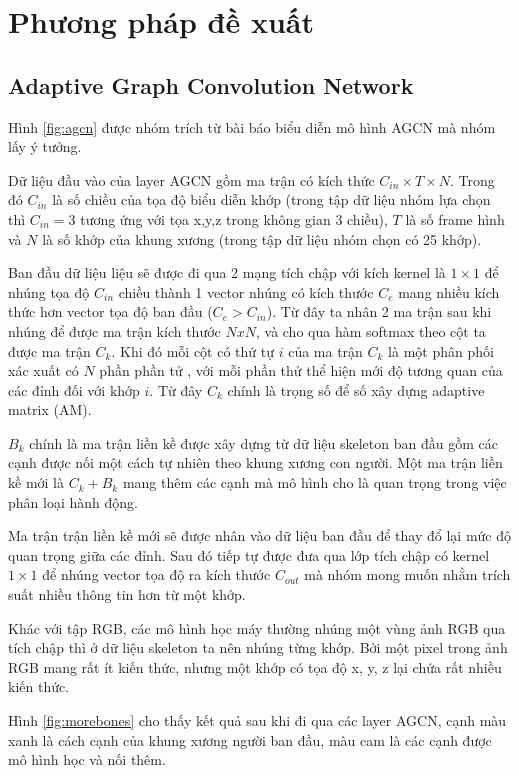 \section{Phương pháp đề xuất}

\subsection{Adaptive Graph Convolution Network}
Hình \ref{fig:agcn} được nhóm trích từ bài báo \cite{shi2020skeleton} biểu diễn mô hình AGCN mà nhóm lấy ý tưởng.


Dữ liệu đầu vào của layer AGCN gồm ma trận có kích thức $C_{in} \times T \times N$. Trong đó $C_{in}$ là số chiều của tọa độ biểu diễn khớp (trong tập dữ liệu nhóm lựa chọn thì $C_{in} = 3$ tương ứng với tọa x,y,z trong không gian 3 chiều), $T$ là số frame hình và $N$ là số khớp của khung xương (trong tập dữ liệu nhóm chọn có 25 khớp).

Ban đầu dữ liệu liệu sẽ được đi qua 2 mạng tích chập với kích kernel là $1 \times 1$ để nhúng tọa độ $C_{in}$ chiều thành 1 vector nhúng có kích thước $C_e$ mang nhiều kích thức hơn vector tọa độ ban đầu ($C_e > C_{in}$). Từ đây ta nhân 2 ma trận sau khi nhúng để được ma trận kích thước $NxN$, và cho qua hàm softmax theo cột ta được ma trận $C_k$. Khi đó mỗi cột có thứ tự $i$ của ma trận $C_k$ là một phân phối xác xuất có $N$ phần phần tử , với mỗi phần thử thể hiện mới độ tương quan của các đỉnh đối với khớp $i$. Từ đây $C_k$ chính là trọng số để số xây dựng adaptive matrix (AM).

$B_k$ chính là ma trận liền kề được xây dựng từ dữ liệu skeleton ban đầu gồm các cạnh được nối một cách tự nhiên theo khung xương con người. Một ma trận liền kề mới là $C_k + B_k$ mang thêm các cạnh mà mô hình cho là quan trọng trong việc phân loại hành động.

Ma trận trận liền kề mới sẽ được nhân vào dữ liệu ban đầu để thay đổ lại mức độ quan trọng giữa các đỉnh. Sau đó tiếp tự được đưa qua lớp tích chập có kernel $1 \times 1$ để nhúng vector tọa độ ra kích thước $C_{out}$ mà nhóm mong muốn nhằm trích suất nhiều thông tin hơn từ một khớp.

Khác với tập RGB, các mô hình học máy thường nhúng một vùng ảnh RGB qua tích chập thì ở dữ liệu skeleton ta nên nhúng từng khớp. Bởi một pixel trong ảnh RGB mang rất ít kiến thức, nhưng một khớp có tọa độ x, y, z lại chứa rất nhiều kiến thức.

Hình \ref{fig:morebones} cho thấy kết quả sau khi đi qua các layer AGCN, cạnh màu xanh là cách cạnh của khung xương người ban đầu, màu cam là các cạnh được mô hình học và nối thêm.


